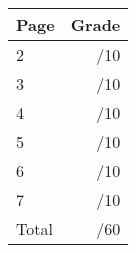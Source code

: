 \documentclass[12pt]{article}
\newcommand{\skipline}{\vspace{12pt}}
\begin{document}
\begin{table}[hbt]
\begin{center}
\begin{tabular}{|l|r|} \hline
Page&Grade\\
\hline \hline
\cline{1-2} 2 & \enspace\enspace\enspace\enspace\enspace\enspace/10\\
\cline{1-2} 3 & \enspace\enspace\enspace\enspace\enspace\enspace/10\\
\cline{1-2} 4 & \enspace\enspace\enspace\enspace\enspace\enspace/10\\
\cline{1-2} 5 & \enspace\enspace\enspace\enspace\enspace\enspace/10\\
\cline{1-2} 6 & \enspace\enspace\enspace\enspace\enspace\enspace/10\\
\cline{1-2} 7 & \enspace\enspace\enspace\enspace\enspace\enspace/10\\
\cline{1-2} Total & \enspace\enspace\enspace\enspace\enspace\enspace/60\\
\hline
\end{tabular}

\skipline

\skipline

\skipline


\end{center}
\end{table}
\newpage
\end{document}
